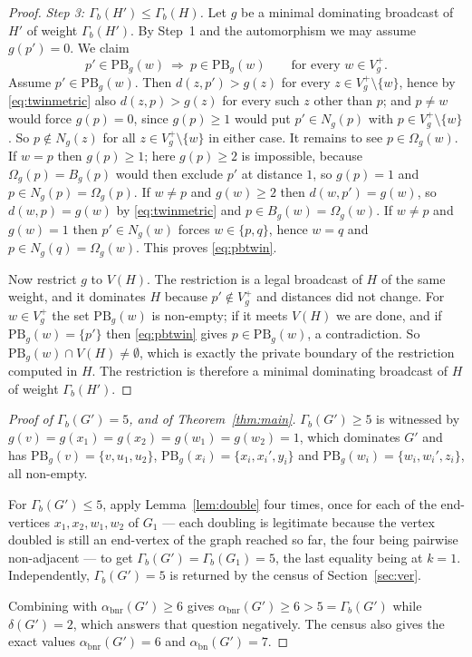 \documentclass[11pt]{amsart}
\theoremstyle{remark}
\DeclareMathOperator{\bnr}{bnr}
\DeclareMathOperator{\bn}{bn}
\newcommand{\abnr}{\alpha_{\bnr}}
\newcommand{\abn}{\alpha_{\bn}}
\newcommand{\Gb}{\Gamma_{b}}
\newcommand{\Gp}{G'}
\newcommand{\PB}{\mathrm{PB}}
\begin{document}
\begin{proof}
\emph{Step 3: $\Gb(H')\le\Gb(H)$.} Let $g$ be a minimal dominating broadcast of
$H'$ of weight $\Gb(H')$. By Step~1 and the automorphism we may assume
$g(p')=0$. We claim
\begin{equation}\label{eq:pbtwin}
 p'\in\PB_g(w)\ \Longrightarrow\ p\in\PB_g(w)
 \qquad\text{for every } w\in V_g^{+}.
\end{equation}
Assume $p'\in\PB_g(w)$. Then $d(z,p')>g(z)$ for every
$z\in V_g^{+}\setminus\{w\}$, hence by \eqref{eq:twinmetric} also $d(z,p)>g(z)$
for every such $z$ other than $p$; and $p\ne w$ would force $g(p)=0$, since
$g(p)\ge1$ would put $p'\in N_g(p)$ with $p\in V_g^{+}\setminus\{w\}$. So
$p\notin N_g(z)$ for all $z\in V_g^{+}\setminus\{w\}$ in either case. It remains
to see $p\in\Omega_g(w)$. If $w=p$ then $g(p)\ge1$; here $g(p)\ge2$ is
impossible, because $\Omega_g(p)=B_g(p)$ would then exclude $p'$ at distance
$1$, so $g(p)=1$ and $p\in N_g(p)=\Omega_g(p)$. If $w\ne p$ and $g(w)\ge2$ then
$d(w,p')=g(w)$, so $d(w,p)=g(w)$ by \eqref{eq:twinmetric} and
$p\in B_g(w)=\Omega_g(w)$. If $w\ne p$ and $g(w)=1$ then $p'\in N_g(w)$ forces
$w\in\{p,q\}$, hence $w=q$ and $p\in N_g(q)=\Omega_g(w)$. This proves
\eqref{eq:pbtwin}.

Now restrict $g$ to $V(H)$. The restriction is a legal broadcast of $H$ of the
same weight, and it dominates $H$ because $p'\notin V_g^{+}$ and distances did
not change. For $w\in V_g^{+}$ the set $\PB_g(w)$ is non-empty; if it meets
$V(H)$ we are done, and if $\PB_g(w)=\{p'\}$ then \eqref{eq:pbtwin} gives
$p\in\PB_g(w)$, a contradiction. So $\PB_g(w)\cap V(H)\ne\emptyset$, which is
exactly the private boundary of the restriction computed in $H$. The restriction
is therefore a minimal dominating broadcast of $H$ of weight $\Gb(H')$.
\end{proof}

\begin{proof}[Proof of $\Gb(\Gp)=5$, and of Theorem~\ref{thm:main}]
$\Gb(\Gp)\ge5$ is witnessed by $g(v)=g(x_1)=g(x_2)=g(w_1)=g(w_2)=1$, which
dominates $\Gp$ and has
$\PB_g(v)=\{v,u_1,u_2\}$, $\PB_g(x_i)=\{x_i,x_i',y_i\}$ and
$\PB_g(w_i)=\{w_i,w_i',z_i\}$, all non-empty.

For $\Gb(\Gp)\le5$, apply Lemma~\ref{lem:double} four times, once for each of the
end-vertices $x_1,x_2,w_1,w_2$ of $G_1$ --- each doubling is legitimate because
the vertex doubled is still an end-vertex of the graph reached so far, the four
being pairwise non-adjacent --- to get $\Gb(\Gp)=\Gb(G_1)=5$, the last equality
being \cite[Proposition~4.8]{MN24} at $k=1$. Independently, $\Gb(\Gp)=5$ is
returned by the census of Section~\ref{sec:ver}.

Combining with $\abnr(\Gp)\ge6$ gives $\abnr(\Gp)\ge6>5=\Gb(\Gp)$ while
$\delta(\Gp)=2$, which answers that question negatively. The census also
gives the exact values $\abnr(\Gp)=6$ and $\abn(\Gp)=7$.
\end{proof}
\end{document}
